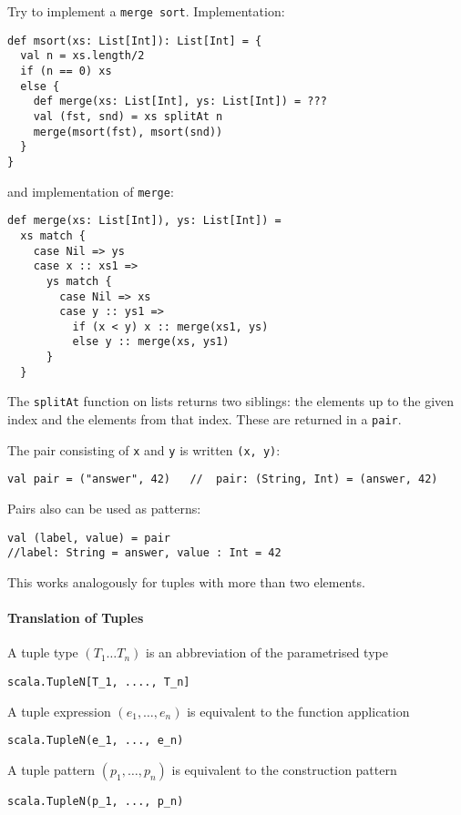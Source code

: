 \documentclass{scrartcl}
\newcommand{\term}[1]{\verb~#1~} %
\begin{document}
Try to implement a \term{merge sort}. Implementation:
\begin{lstlisting}
def msort(xs: List[Int]): List[Int] = {
  val n = xs.length/2
  if (n == 0) xs
  else {
    def merge(xs: List[Int], ys: List[Int]) = ???
    val (fst, snd) = xs splitAt n
    merge(msort(fst), msort(snd))
  }
}
\end{lstlisting}
and implementation of \lstinline|merge|:
\begin{lstlisting}
def merge(xs: List[Int]), ys: List[Int]) = 
  xs match {
    case Nil => ys
    case x :: xs1 => 
      ys match {
        case Nil => xs
        case y :: ys1 =>
          if (x < y) x :: merge(xs1, ys)
          else y :: merge(xs, ys1)
      }
  }
\end{lstlisting}
The \lstinline|splitAt| function on lists returns two siblings: the elements up
to the given index and the elements from that index. These are returned in a
\term{pair}.

The pair consisting of \lstinline|x| and \lstinline|y| is written 
\lstinline|(x, y)|:
\begin{lstlisting}
val pair = ("answer", 42)   //  pair: (String, Int) = (answer, 42)
\end{lstlisting}

Pairs also can be used as patterns:
\begin{lstlisting}
val (label, value) = pair 
//label: String = answer, value : Int = 42
\end{lstlisting}

This works analogously for tuples with more than two elements.

\paragraph{Translation of Tuples}

A tuple type $(T_1 \dots T_n)$ is an abbreviation of the parametrised type 
\begin{lstlisting}
scala.TupleN[T_1, ...., T_n]
\end{lstlisting}

A tuple expression $(e_1, \dots, e_n)$ is equivalent to the function application 
\begin{lstlisting}
scala.TupleN(e_1, ..., e_n)
\end{lstlisting}
A tuple pattern $(p_1, \dots,p_n)$ is equivalent to the construction pattern
\begin{lstlisting}
scala.TupleN(p_1, ..., p_n)
\end{lstlisting}
\end{document}

